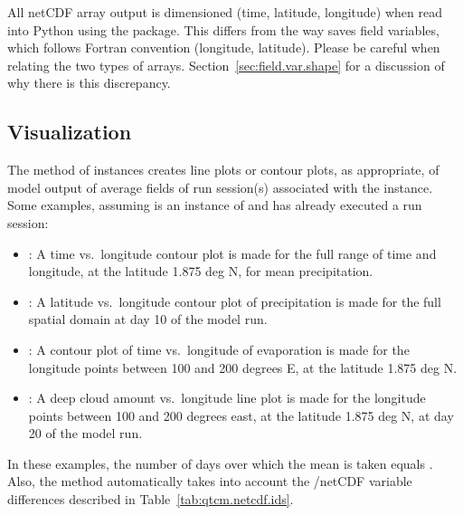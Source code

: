   All netCDF array output is dimensioned (time, latitude,
longitude) when read into Python using the  package.
This differs from the way  saves field variables, which
follows Fortran convention (longitude, latitude).  Please be careful
when relating the two types of arrays.
Section~\ref{sec:field.var.shape} for a discussion of why there is
this discrepancy.


	\subsection{Visualization}	\label{sec:viz.intro}

The  method of  instances creates line
plots or contour plots, as appropriate, of model output of
average fields of run session(s) associated with the instance.
Some examples, assuming  is an instance of 
and has already executed a run session:
\begin{itemize}
\item {}:
	A time vs.\ longitude contour
          plot is made for the full range of time and longitude,
          at the latitude 1.875 deg N, for mean precipitation.

\item {}:
	A latitude vs.\ longitude contour plot of precipitation
	is made for the full spatial domain at day 10 of the model run.

\item {}:  A contour
	plot of time vs.\ longitude of evaporation is made for the
          longitude points between 100 and 200 degrees E, at the
          latitude 1.875 deg N.  

\item {}:
          A deep cloud amount vs.\ longitude line plot is made for
          the longitude points between 100 and 200 degrees east,
          at the latitude 1.875 deg N, at day 20 of the model run.
\end{itemize}

In these examples, the number of days over which the mean is taken
equals .
Also, the  method automatically takes into account the
/netCDF variable differences described in
Table~\ref{tab:qtcm.netcdf.ids}.



